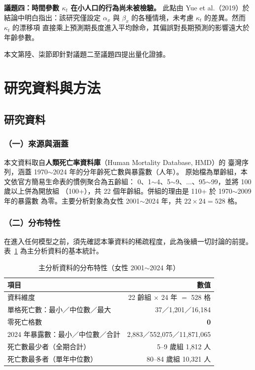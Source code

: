 \documentclass[UTF8, fontset=macnew, a4paper, 12pt]{ctexart}
\begin{document}
\textbf{議題四：時間參數 $\kappa_t$ 在小人口的行為尚未被檢驗。}
此點由 Yue et al.（2019）於結論中明白指出：該研究僅設定 $\alpha_x$ 與
$\beta_x$ 的各種情境，未考慮 $\kappa_t$ 的差異。然而 $\kappa_t$ 的漂移項
直接乘上預測期長度進入平均餘命，其偏誤對長期預測的影響遠大於年齡參數。

本文第陸、柒節即針對議題二至議題四提出量化證據。

\section{研究資料與方法}

\subsection{研究資料}

\subsubsection{（一）來源與涵蓋}

本文資料取自\textbf{人類死亡率資料庫}（Human Mortality Database, HMD）的
臺灣序列，涵蓋 1970$\sim$2024 年的分年齡死亡數與暴露數（人年）。
原始檔為單齡組，本文依官方簡易生命表的慣例聚合為五齡組：
0、1$\sim$4、5$\sim$9、$\ldots$、95$\sim$99，並將 100 歲以上併為開放組
（100+），共 22 個年齡組。併組的理由是 110+ 於 1970$\sim$2009 年的暴露數
為零。主要分析對象為女性 2001$\sim$2024 年，共 $22\times24=528$ 格。

\subsubsection{（二）分布特性}

在進入任何模型之前，須先確認本筆資料的稀疏程度，此為後續一切討論的前提。
表~\ref{tab:datadesc} 為主分析資料的基本統計。

\begin{table}[H]
\centering
\caption{主分析資料的分布特性（女性 2001$\sim$2024 年）}
\small
\begin{tabular}{lr}
\toprule
項目 & 數值\\
\midrule
資料維度 & 22 齡組 $\times$ 24 年 $=$ 528 格\\
單格死亡數：最小／中位數／最大 & 37／1,201／16,184\\
零死亡格數 & \textbf{0}\\
2024 年暴露數：最小／中位數／合計 & 2,883／552,075／11,871,065\\
死亡數最少者（全期合計） & 5--9 歲組 1,812 人\\
死亡數最多者（單年中位數） & 80--84 歲組 10,321 人\\
\bottomrule
\end{tabular}
\label{tab:datadesc}
\end{table}
\end{document}
